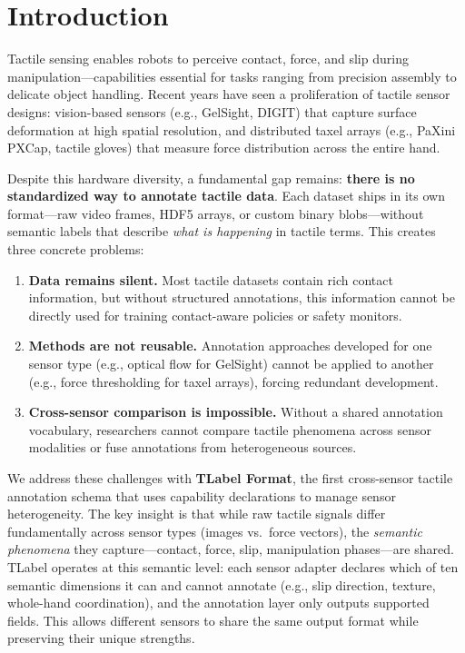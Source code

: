 \documentclass[conference]{IEEEtran}
\begin{document}
\section{Introduction}

Tactile sensing enables robots to perceive contact, force, and slip during manipulation---capabilities essential for tasks ranging from precision assembly to delicate object handling. Recent years have seen a proliferation of tactile sensor designs: vision-based sensors (e.g., GelSight, DIGIT) that capture surface deformation at high spatial resolution, and distributed taxel arrays (e.g., PaXini PXCap, tactile gloves) that measure force distribution across the entire hand.

Despite this hardware diversity, a fundamental gap remains: \textbf{there is no standardized way to annotate tactile data}. Each dataset ships in its own format---raw video frames, HDF5 arrays, or custom binary blobs---without semantic labels that describe \emph{what is happening} in tactile terms. This creates three concrete problems:

\begin{enumerate}
\item \textbf{Data remains silent.} Most tactile datasets contain rich contact information, but without structured annotations, this information cannot be directly used for training contact-aware policies or safety monitors.
\item \textbf{Methods are not reusable.} Annotation approaches developed for one sensor type (e.g., optical flow for GelSight) cannot be applied to another (e.g., force thresholding for taxel arrays), forcing redundant development.
\item \textbf{Cross-sensor comparison is impossible.} Without a shared annotation vocabulary, researchers cannot compare tactile phenomena across sensor modalities or fuse annotations from heterogeneous sources.
\end{enumerate}

We address these challenges with \textbf{TLabel Format}, the first cross-sensor tactile annotation schema that uses capability declarations to manage sensor heterogeneity. The key insight is that while raw tactile signals differ fundamentally across sensor types (images vs.\ force vectors), the \emph{semantic phenomena} they capture---contact, force, slip, manipulation phases---are shared. TLabel operates at this semantic level: each sensor adapter declares which of ten semantic dimensions it can and cannot annotate (e.g., slip direction, texture, whole-hand coordination), and the annotation layer only outputs supported fields. This allows different sensors to share the same output format while preserving their unique strengths.
\end{document}
